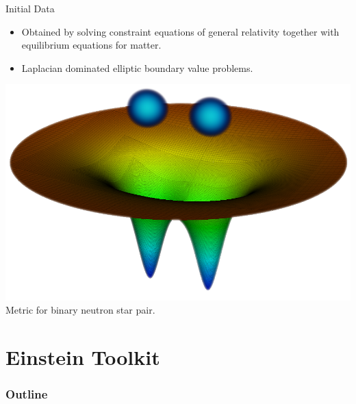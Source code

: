 \documentclass{beamer}
\begin{document}
\begin{frame}{Initial Data}
    \begin{itemize}
        \item Obtained by solving constraint equations of general relativity together with equilibrium equations for matter.
        \item Laplacian dominated elliptic boundary value problems.
    \end{itemize}
\begin{center}
    \includegraphics[scale=0.2]{bnsgrid.png} \\Metric for binary neutron star pair.
\end{center}
\end{frame}

\section{Einstein Toolkit}
\begin{frame}
\frametitle{Outline}
  \tableofcontents[currentsection]
\end{frame}
\end{document}
